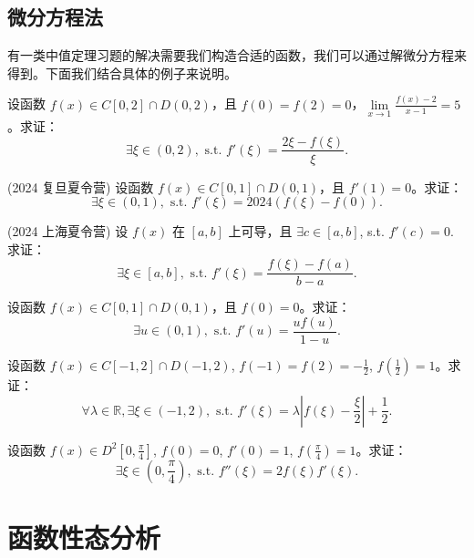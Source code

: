 \documentclass[lang=cn,10pt,thmcnt=section]{elegantbook}
\begin{document}
\subsection{微分方程法}
有一类中值定理习题的解决需要我们构造合适的函数，我们可以通过解微分方程来得到。下面我们结合具体的例子来说明。
\begin{example}
	设函数 \( f(x) \in C[0,2] \cap D(0,2) \)，且 \( f(0) = f(2) = 0 \)，\(\lim\limits_{x \to 1} \frac{f(x) - 2}{x - 1} = 5\)。求证：
\[ \exists \xi \in (0,2), \text{ s.t. } f'(\xi) = \frac{2\xi - f(\xi)}{\xi}. \]
\end{example}
\begin{example}
	(2024 复旦夏令营) 设函数 \( f(x) \in C[0,1] \cap D(0,1) \)，且 \( f'(1) = 0 \)。求证：
\[ \exists \xi \in (0,1), \text{ s.t. } f'(\xi) = 2024(f(\xi) - f(0)). \]
\end{example}
\begin{example}
	(2024 上海夏令营) 设 \( f(x) \) 在 \([a,b]\) 上可导，且 \(\exists c \in [a,b]\), s.t. \( f'(c) = 0 \). 求证：
\[ \exists \xi \in [a,b], \text{ s.t. } f'(\xi) = \frac{f(\xi) - f(a)}{b - a}. \]
\end{example}
\begin{example}
	设函数 \( f(x) \in C[0,1] \cap D(0,1) \)，且 \( f(0) = 0 \)。求证：
    \[ \exists u \in (0,1), \text{ s.t. } f'(u) = \frac{u f(u)}{1 - u}. \]
\end{example}
\begin{example}
	设函数 \( f(x) \in C[-1,2] \cap D(-1,2) \), \( f(-1) = f(2) = -\frac{1}{2} \), \( f\left(\frac{1}{2}\right) = 1 \)。求证：
    \[ \forall \lambda \in \mathbb{R}, \exists \xi \in (-1,2), \text{ s.t. } f'(\xi) = \lambda \left|f(\xi) - \frac{\xi}{2}\right| + \frac{1}{2}. \]
\end{example}
\begin{example}
	设函数 \( f(x) \in D^2\left[0,\frac{\pi}{4}\right] \), \( f(0) = 0 \), \( f'(0) = 1 \), \( f\left(\frac{\pi}{4}\right) = 1 \)。求证：
    \[ \exists \xi \in \left(0,\frac{\pi}{4}\right), \text{ s.t. } f''(\xi) = 2f(\xi)f'(\xi). \]
\end{example}
\section{函数性态分析}
\end{document}
